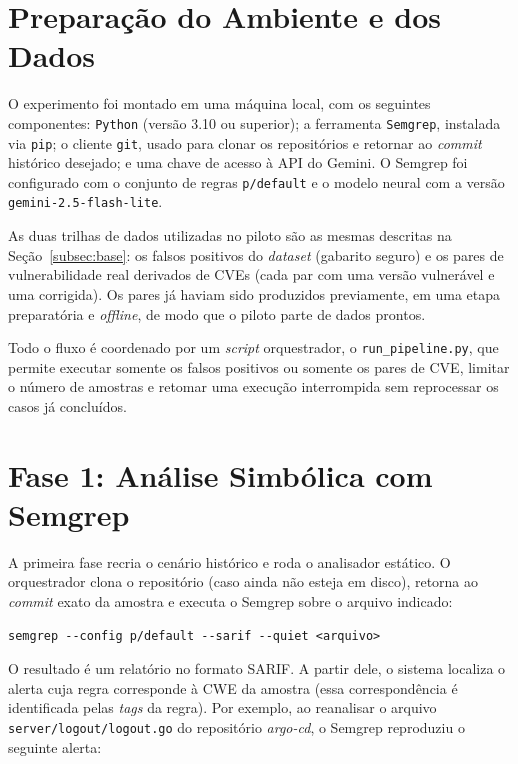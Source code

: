 \section{Preparação do Ambiente e dos Dados}

O experimento foi montado em uma máquina local, com os seguintes componentes: \texttt{Python} (versão 3.10 ou superior); a ferramenta \texttt{Semgrep}, instalada via \texttt{pip}; o cliente \texttt{git}, usado para clonar os repositórios e retornar ao \textit{commit} histórico desejado; e uma chave de acesso à API do Gemini. O Semgrep foi configurado com o conjunto de regras \texttt{p/default} e o modelo neural com a versão \texttt{gemini-2.5-flash-lite}.

As duas trilhas de dados utilizadas no piloto são as mesmas descritas na Seção~\ref{subsec:base}: os falsos positivos do \textit{dataset} (gabarito seguro) e os pares de vulnerabilidade real derivados de CVEs (cada par com uma versão vulnerável e uma corrigida). Os pares já haviam sido produzidos previamente, em uma etapa preparatória e \textit{offline}, de modo que o piloto parte de dados prontos.

Todo o fluxo é coordenado por um \textit{script} orquestrador, o \texttt{run\_pipeline.py}, que permite executar somente os falsos positivos ou somente os pares de CVE, limitar o número de amostras e retomar uma execução interrompida sem reprocessar os casos já concluídos.

\section{Fase 1: Análise Simbólica com Semgrep}

A primeira fase recria o cenário histórico e roda o analisador estático. O orquestrador clona o repositório (caso ainda não esteja em disco), retorna ao \textit{commit} exato da amostra e executa o Semgrep sobre o arquivo indicado:

\begin{verbatim}
semgrep --config p/default --sarif --quiet <arquivo>
\end{verbatim}

O resultado é um relatório no formato SARIF. A partir dele, o sistema localiza o alerta cuja regra corresponde à CWE da amostra (essa correspondência é identificada pelas \textit{tags} da regra). Por exemplo, ao reanalisar o arquivo \texttt{server/logout/logout.go} do repositório \textit{argo-cd}, o Semgrep reproduziu o seguinte alerta:


